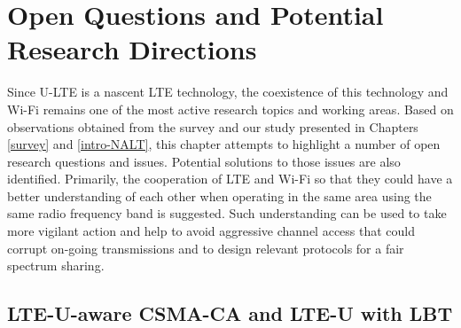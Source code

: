 %
%
%
\chapter{Open Questions and Potential Research Directions}
\label{open-research} %


Since \mbox{U-LTE} is a nascent LTE technology, the coexistence of this technology and \mbox{Wi-Fi} remains one of the most active research topics and working areas. Based on observations obtained from the survey and our study presented in Chapters \ref{survey} and \ref{intro-NALT}, this chapter attempts to highlight a number of open research questions and issues. Potential solutions to those issues are also identified. Primarily, the cooperation of LTE and \mbox{Wi-Fi} so that they could have a better understanding of each other when operating in the same area using the same radio frequency band is suggested. Such understanding can be used to take more vigilant action and help to avoid aggressive channel access that could corrupt on-going transmissions and to design relevant protocols for a fair spectrum sharing.

\section{LTE-U-aware CSMA-CA and LTE-U with LBT}
\label{subsection:LTE-U-aware}

